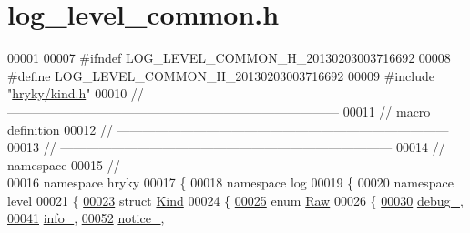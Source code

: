 \hypertarget{log__level__common_8h_source}{\section{log\-\_\-level\-\_\-common.\-h}
}

\begin{DoxyCode}
00001 
00007 \textcolor{preprocessor}{#ifndef LOG\_LEVEL\_COMMON\_H\_20130203003716692}
00008 \textcolor{preprocessor}{}\textcolor{preprocessor}{#define LOG\_LEVEL\_COMMON\_H\_20130203003716692}
00009 \textcolor{preprocessor}{}\textcolor{preprocessor}{#include "\hyperlink{kind_8h}{hryky/kind.h}"}
00010 \textcolor{comment}{//
      ------------------------------------------------------------------------------}
00011 \textcolor{comment}{// macro definition}
00012 \textcolor{comment}{//
      ------------------------------------------------------------------------------}
00013 \textcolor{comment}{//
      ------------------------------------------------------------------------------}
00014 \textcolor{comment}{// namespace}
00015 \textcolor{comment}{//
      ------------------------------------------------------------------------------}
00016 \textcolor{keyword}{namespace }hryky
00017 \{
00018 \textcolor{keyword}{namespace }log
00019 \{
00020 \textcolor{keyword}{namespace }level
00021 \{
\hypertarget{log__level__common_8h_source_l00023}{}\hyperlink{structhryky_1_1log_1_1level_1_1_kind}{00023}     \textcolor{keyword}{struct }\hyperlink{structhryky_1_1log_1_1level_1_1_kind}{Kind}
00024     \{
\hypertarget{log__level__common_8h_source_l00025}{}\hyperlink{structhryky_1_1log_1_1level_1_1_kind_aa121006343f8971f566b5490b8001b21}{00025}         \textcolor{keyword}{enum} \hyperlink{structhryky_1_1log_1_1level_1_1_kind_aa121006343f8971f566b5490b8001b21}{Raw}
00026         \{
\hypertarget{log__level__common_8h_source_l00030}{}\hyperlink{structhryky_1_1log_1_1level_1_1_kind_aa121006343f8971f566b5490b8001b21ac0a8f52590796a1f311111dae15c6af8}{00030}             \hyperlink{structhryky_1_1log_1_1level_1_1_kind_aa121006343f8971f566b5490b8001b21ac0a8f52590796a1f311111dae15c6af8}{debug_},
\hypertarget{log__level__common_8h_source_l00041}{}\hyperlink{structhryky_1_1log_1_1level_1_1_kind_aa121006343f8971f566b5490b8001b21a101e156d0dbeb1bc9a4930fa365a5816}{00041}             \hyperlink{structhryky_1_1log_1_1level_1_1_kind_aa121006343f8971f566b5490b8001b21a101e156d0dbeb1bc9a4930fa365a5816}{info_},
\hypertarget{log__level__common_8h_source_l00052}{}\hyperlink{structhryky_1_1log_1_1level_1_1_kind_aa121006343f8971f566b5490b8001b21a0d27806ab638f3d364a201799beb0915}{00052}             \hyperlink{structhryky_1_1log_1_1level_1_1_kind_aa121006343f8971f566b5490b8001b21a0d27806ab638f3d364a201799beb0915}{notice_},

\end{DoxyCode}
